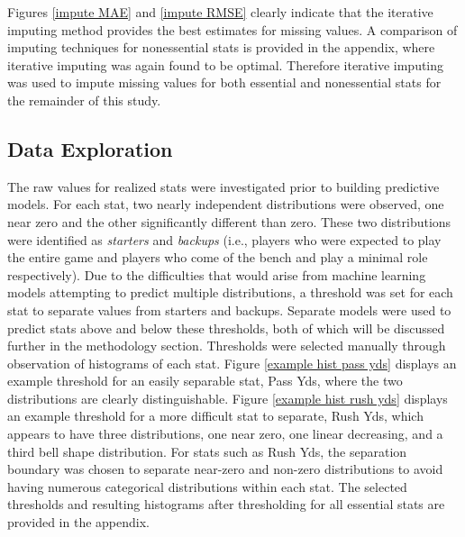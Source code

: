 \documentclass[12pt]{article}
\begin{document}
Figures \ref{impute MAE} and \ref{impute RMSE} clearly indicate that the iterative imputing method provides the best estimates for missing values.  A comparison of imputing techniques for nonessential stats is provided in the appendix, where iterative imputing was again found to be optimal. Therefore iterative imputing was used to impute missing values for both essential and nonessential stats for the remainder of this study.

\subsection{Data Exploration}

The raw values for realized stats were investigated prior to building predictive models. For each stat, two nearly independent distributions were observed, one near zero and the other significantly different than zero. These two distributions were identified as \textit{starters} and \textit{backups} (i.e., players who were expected to play the entire game and players who come of the bench and play a minimal role respectively). Due to the difficulties that would arise from machine learning models attempting to predict multiple distributions, a threshold was set for each stat to separate values from starters and backups. Separate models were used to predict stats above and below these thresholds, both of which will be discussed further in the methodology section. Thresholds were selected manually through observation of histograms of each stat. Figure \ref{example hist pass yds} displays an example threshold for an easily separable stat, Pass Yds, where the two distributions are clearly distinguishable. Figure \ref{example hist rush yds} displays an example threshold for a more difficult stat to separate, Rush Yds, which appears to have three distributions, one near zero, one linear decreasing, and a third bell shape distribution. For stats such as Rush Yds, the separation boundary was chosen to separate near-zero and non-zero distributions to avoid having numerous categorical distributions within each stat. The selected thresholds and resulting histograms after thresholding for all essential stats are provided in the appendix.
\end{document}
